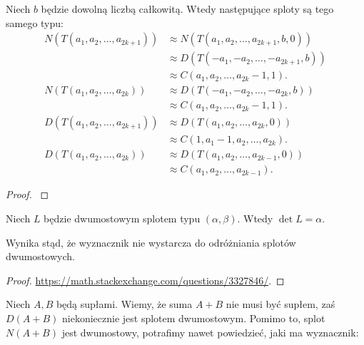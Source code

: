 \begin{proposition}
    Niech $b$ będzie dowolną liczbą całkowitą.
    Wtedy następujące sploty są tego samego typu:
    \begin{align}
        N(T(a_1, a_2, \ldots, a_{2k+1})) & \approx N(T(a_1, a_2, \ldots, a_{2k+1}, b, 0)) \\
                                         & \approx D(T(-a_1, -a_2, \ldots, -a_{2k+1}, b)) \\
                                         & \approx C(a_1, a_2, \ldots, a_{2k}-1, 1). \\
        N(T(a_1, a_2, \ldots, a_{2k}))   & \approx D(T(-a_1, -a_2, \ldots, -a_{2k}, b)) \\
                                         & \approx C(a_1, a_2, \ldots, a_{2k}-1, 1). \\
        D(T(a_1, a_2, \ldots, a_{2k+1})) & \approx D(T(a_1, a_2, \ldots, a_{2k}, 0)) \\
                                         & \approx C(1, a_1-1, a_2, \ldots, a_{2k}). \\
        D(T(a_1, a_2, \ldots, a_{2k}))   & \approx D(T(a_1, a_2, \ldots, a_{2k-1}, 0)) \\
                                         & \approx C(a_1, a_2, \ldots, a_{2k-1}).
    \end{align}
\end{proposition}

\begin{proof}
    \cite[fakt 9.3.4]{murasugi96}
\end{proof}

\begin{proposition}
    Niech $L$ będzie dwumostowym splotem typu $(\alpha, \beta)$.
    Wtedy $\det L = \alpha$.
\end{proposition}

Wynika stąd, że wyznacznik nie wystarcza do odróżniania splotów dwumostowych.

\begin{proof}
    \url{https://math.stackexchange.com/questions/3327846/}.
\end{proof}

Niech $A, B$ będą supłami.
Wiemy, że suma $A+B$ nie musi być supłem, zaś $D(A+B)$ niekoniecznie jest splotem dwumostowym.
Pomimo to, splot $N(A+B)$ jest dwumostowy, potrafimy nawet powiedzieć, jaki ma wyznacznik:

